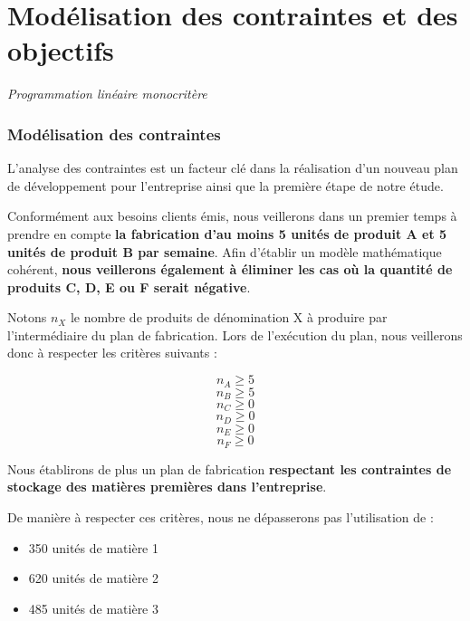 \documentclass[a4paper,10pt]{article}
\begin{document}
\part{Modélisation des contraintes et des objectifs}
\begin{large}
\emph{Programmation linéaire monocritère}
\end{large}


\section{Modélisation des contraintes}
L'analyse des contraintes est un facteur clé dans la réalisation d'un nouveau plan de développement pour l'entreprise ainsi que la première étape de notre étude.
\vspace{\baselineskip}

Conformément aux besoins clients émis, nous veillerons dans un premier temps à prendre en compte \textbf{la fabrication d'au moins 5 unités de produit A et 5 unités de produit B par semaine}. Afin d'établir un modèle mathématique cohérent, \textbf{nous veillerons également à éliminer les cas où la quantité de produits C, D, E ou F serait négative}.\newline

Notons $n_X$ le nombre de produits de dénomination X à produire par l'intermédiaire du plan de fabrication. Lors de l'exécution du plan, nous veillerons donc à respecter les critères suivants :

$$n_A \geq 5$$
$$n_B \geq 5$$
$$n_C \geq 0$$
$$n_D \geq 0$$
$$n_E \geq 0$$
$$n_F \geq 0$$

Nous établirons de plus un plan de fabrication \textbf{respectant les contraintes de stockage des matières premières dans l'entreprise}.

De manière à respecter ces critères, nous ne dépasserons pas l'utilisation de :
\newline
\begin{itemize}
\item 350 unités de matière 1
\item 620 unités de matière 2
\item 485 unités de matière 3\newline
\end{itemize}
\end{document}
